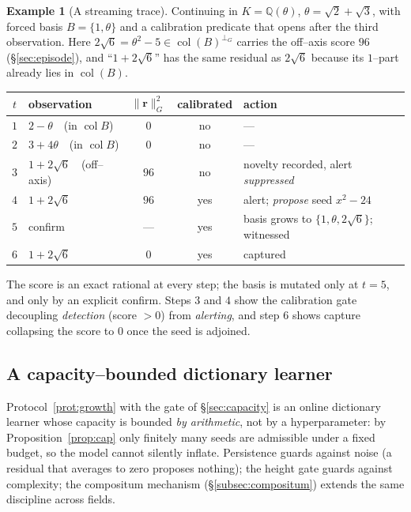 \documentclass[11pt]{article}
\theoremstyle{plain}
\theoremstyle{definition}
\newtheorem{example}[theorem]{Example}
\theoremstyle{remark}
\newcommand{\Q}{\mathbb{Q}}
\newcommand{\K}{K}
\newcommand{\rr}{\mathbf{r}}
\newcommand{\GG}{G}
\newcommand{\BB}{B}
\DeclareMathOperator{\col}{col}
\begin{document}
\begin{example}[A streaming trace]\label{ex:stream}
Continuing in $\K=\Q(\theta)$, $\theta=\sqrt2+\sqrt3$, with forced basis $\BB=\{1,\theta\}$ and a calibration
predicate that opens after the third observation. Here $2\sqrt6=\theta^2-5\in\col(\BB)^{\perp_{\GG}}$ carries
the off--axis score $96$ (\S\ref{sec:episode}), and ``$1+2\sqrt6$'' has the same residual as $2\sqrt6$ because
its $1$--part already lies in $\col(\BB)$.
\begin{center}
\begin{tabular}{clccl}
\toprule
$t$ & observation & $\lVert\rr\rVert_{\GG}^2$ & calibrated & action \\
\midrule
$1$ & $2-\theta$\ \ (in $\col\BB$)   & $0$  & no  & --- \\
$2$ & $3+4\theta$\ \ (in $\col\BB$)  & $0$  & no  & --- \\
$3$ & $1+2\sqrt6$\ \ (off--axis)     & $96$ & no  & novelty recorded, alert \emph{suppressed} \\
$4$ & $1+2\sqrt6$                    & $96$ & yes & alert; \emph{propose} seed $x^2-24$ \\
$5$ & confirm                        & ---  & yes & basis grows to $\{1,\theta,2\sqrt6\}$; witnessed \\
$6$ & $1+2\sqrt6$                    & $0$  & yes & captured \\
\bottomrule
\end{tabular}
\end{center}
The score is an exact rational at every step; the basis is mutated only at $t=5$, and only by an explicit
confirm. Steps $3$ and $4$ show the calibration gate decoupling \emph{detection} (score $>0$) from
\emph{alerting}, and step $6$ shows capture collapsing the score to $0$ once the seed is adjoined.
\end{example}

\subsection{A capacity--bounded dictionary learner}
Protocol~\ref{prot:growth} with the gate of \S\ref{sec:capacity} is an online dictionary learner whose
capacity is bounded \emph{by arithmetic}, not by a hyperparameter: by Proposition~\ref{prop:cap} only finitely
many seeds are admissible under a fixed budget, so the model cannot silently inflate. Persistence guards
against noise (a residual that averages to zero proposes nothing); the height gate guards against complexity;
the compositum mechanism (\S\ref{subsec:compositum}) extends the same discipline across fields.
\end{document}

